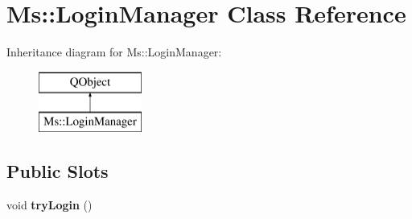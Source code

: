 \hypertarget{class_ms_1_1_login_manager}{}\section{Ms\+:\+:Login\+Manager Class Reference}
\label{class_ms_1_1_login_manager}
Inheritance diagram for Ms\+:\+:Login\+Manager\+:\begin{figure}[H]
\begin{center}
\leavevmode
\includegraphics[height=2.000000cm]{class_ms_1_1_login_manager}
\end{center}
\end{figure}
\subsection*{Public Slots}
\begin{DoxyCompactItemize}
\item 
\mbox{\label{class_ms_1_1_login_manager_a3d71d6e3bc3942a32cf10912e4706fd9}} 
void {\bfseries try\+Login} ()
\end{DoxyCompactItemize}
